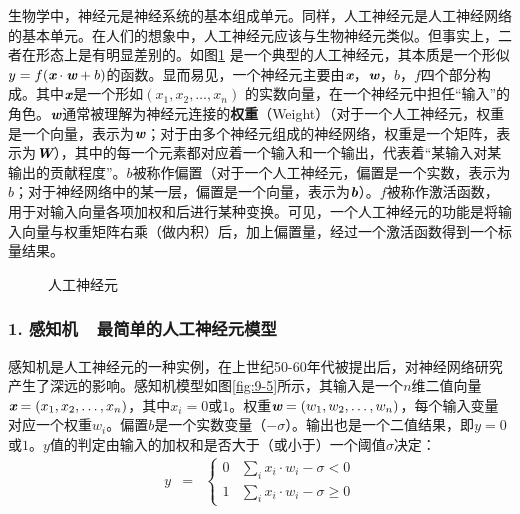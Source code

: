 \parinterval 生物学中，神经元是神经系统的基本组成单元。同样，人工神经元是人工神经网络的基本单元。在人们的想象中，人工神经元应该与生物神经元类似。但事实上，二者在形态上是有明显差别的。如图\ref{fig:9-4} 是一个典型的人工神经元，其本质是一个形似$ y=f({\textbf{\em x}}\cdot {\textbf{\em w}}+b) $的函数。显而易见，一个神经元主要由$ {\textbf{\em x}} $，$ {\textbf{\em w}} $，$ b $，$ f $四个部分构成。其中$ {\textbf{\em x}} $是一个形如$ (x_1,x_2,\dots,x_n) $ 的实数向量，在一个神经元中担任“输入”的角色。$ {\textbf{\em w}} $通常被理解为神经元连接的{\small\sffamily\bfseries{权重}}（Weight）（对于一个人工神经元，权重是一个向量，表示为$ {\textbf{\em w}} $；对于由多个神经元组成的神经网络，权重是一个矩阵，表示为$ {\textbf{\em W}} $），其中的每一个元素都对应着一个输入和一个输出，代表着“某输入对某输出的贡献程度”。$ b $被称作偏置（对于一个人工神经元，偏置是一个实数，表示为$b$；对于神经网络中的某一层，偏置是一个向量，表示为${\textbf{\em b}}$）。$ f $被称作激活函数，用于对输入向量各项加权和后进行某种变换。可见，一个人工神经元的功能是将输入向量与权重矩阵右乘（做内积）后，加上偏置量，经过一个激活函数得到一个标量结果。

\begin{figure}[htp]
\centering

\caption{人工神经元}
\label{fig:9-4}
\end{figure}


\vspace{-0.5em}
\subsubsection{1. 感知机\ \dash \ 最简单的人工神经元模型}

\vspace{0.5em}
\parinterval 感知机是人工神经元的一种实例，在上世纪50-60年代被提出后，对神经网络研究产生了深远的影响。感知机模型如图\ref {fig:9-5}所示，其输入是一个$n$维二值向量$ {\textbf{\em x}}=(x_1,x_2,\dots,x_n) $，其中$ x_i=0 $或$ 1 $。权重${\textbf{\em w}}=(w_1,w_2,\dots,w_n) $，每个输入变量对应一个权重$ w_i $。偏置$ b $是一个实数变量（$ -\sigma $）。输出也是一个二值结果，即$ y=0 $或$ 1 $。$ y $值的判定由输入的加权和是否大于（或小于）一个阈值$ \sigma $决定：
\begin{eqnarray}
y&=&\begin{cases} 0 & \sum_{i}{x_i\cdot w_i}-\sigma <0\\1 & \sum_{i}{x_i\cdot w_i}-\sigma \geqslant 0\end{cases}
\label{eq:9-19}
\end{eqnarray}

